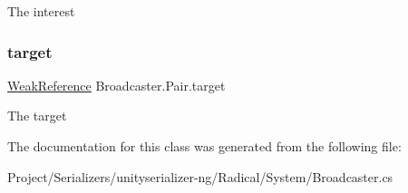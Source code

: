 The interest 

\mbox{\label{class_broadcaster_1_1_pair_ae3e5361ccca9a77940093ed3e9a62919}} 
\subsubsection{\texorpdfstring{target}{target}}
{\footnotesize\ttfamily \hyperlink{class_weak_reference}{Weak\+Reference} Broadcaster.\+Pair.\+target}



The target 



The documentation for this class was generated from the following file\+:\begin{DoxyCompactItemize}
\item 
Project/\+Serializers/unityserializer-\/ng/\+Radical/\+System/Broadcaster.\+cs\end{DoxyCompactItemize}
